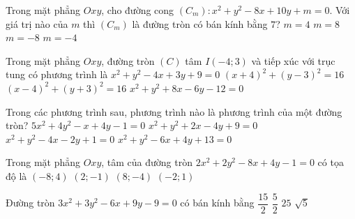 \begin{ex}%
	Trong mặt phẳng $Oxy$, cho đường cong $\left(C_m \right) \colon x^2+y^2-8x+10y+m=0$. Với giá trị nào của $m$  thì $\left(C_m \right)$ là đường tròn có bán kính bằng $7$?
	 \choice
		 {$m=4$}
		{$m=8$} 
		 {\True $m=-8$}
		 {$m =-4$}
\end{ex}

\begin{ex}%
	Trong mặt phẳng $Oxy$, đường tròn $(C)$ tâm $I(-4;3)$ và tiếp xúc  với trục tung có phương trình là
	\choice 
		 {$x^2+y^2-4x+3y+9=0$}
		{\True $(x+4)^2+(y-3)^2=16$} 
		 {$(x-4)^2+(y+3)^2=16$}
		 {$x^2+y^2+8x-6y-12=0$}
\end{ex}

\begin{ex}%
	Trong các phương  trình sau, phương trình nào là phương trình của một đường tròn?
	 \choice
		{$5x^2+4y^2-x+4y-1=0$} 
		 {$x^2+y^2+2x-4y+9=0$}
		 {\True $x^2+y^2-4x-2y+1=0$}
		{$x^2+y^2-6x+4y+13=0$} 
\end{ex}

\begin{ex}%
	Trong mặt phẳng $Oxy$, tâm của đường tròn $2x^2+2y^2-8x+4y-1=0$ có  tọa độ là
	\choice 
		{$(-8;4)$} 
		{\True  $(2;-1)$}
		 {$(8;-4)$}
		 {$(-2;1)$}
\end{ex}

\begin{ex}%
	Đường tròn  $3x^2+3y^2-6x+9y-9=0$ có bán kính bằng
	 \choice
		 {$\dfrac{15}{2}$}
		{\True $\dfrac{5}{2}$} 
		 {$25$}
		 {$\sqrt{5}$}
\end{ex}

